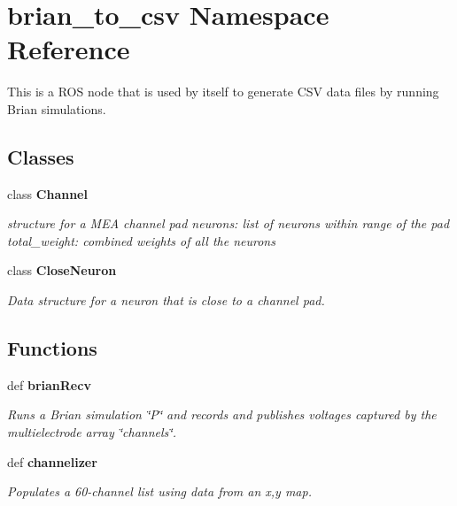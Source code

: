 \section{brian\-\_\-to\-\_\-csv \-Namespace \-Reference}
\label{namespacebrian__to__csv}


\-This is a \-R\-O\-S node that is used by itself to generate \-C\-S\-V data files by running \-Brian simulations.  


\subsection*{\-Classes}
\begin{DoxyCompactItemize}
\item 
class {\bf \-Channel}
\begin{DoxyCompactList}\small\item\em structure for a \-M\-E\-A channel pad neurons\-: list of neurons within range of the pad total\-\_\-weight\-: combined weights of all the neurons \end{DoxyCompactList}\item 
class {\bf \-Close\-Neuron}
\begin{DoxyCompactList}\small\item\em \-Data structure for a neuron that is close to a channel pad. \end{DoxyCompactList}\end{DoxyCompactItemize}
\subsection*{\-Functions}
\begin{DoxyCompactItemize}
\item 
def {\bf brian\-Recv}
\begin{DoxyCompactList}\small\item\em \-Runs a \-Brian simulation \char`\"{}\-P\char`\"{} and records and publishes voltages captured by the multielectrode array \char`\"{}channels\char`\"{}. \end{DoxyCompactList}\item 
def {\bf channelizer}
\begin{DoxyCompactList}\small\item\em \-Populates a 60-\/channel list using data from an x,y map. \end{DoxyCompactList}\end{DoxyCompactItemize}

